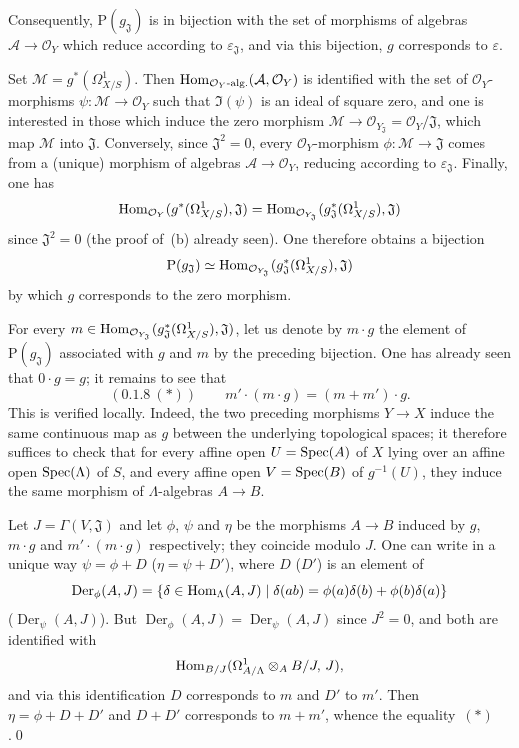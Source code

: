 Consequently, \(\mathrm{P}(g_{\mathfrak{J}})\) is in bijection with the set of
morphisms of algebras \(\mathcal{A}\to\mathcal{O}_{Y}\) which reduce according
to \(\varepsilon_{\mathfrak{J}}\), and via this bijection, \(g\) corresponds
to \(\varepsilon\).

Set \(\mathcal{M}=g^{*}(\Omega^{1}_{X/S})\). Then
\(\operatorname{Hom}_{\mathcal{O}_{Y}\textup{-alg.}}(\mathcal{A},\mathcal{O}_{Y})\) is
identified with the set of \(\mathcal{O}_{Y}\)-morphisms
\(\psi\colon\mathcal{M}\to\mathcal{O}_{Y}\) such that \(\Im(\psi)\) is an ideal
of square zero, and one is interested in those which induce the zero
morphism \(\mathcal{M}\to\mathcal{O}_{Y_{\mathfrak{J}}}
=\mathcal{O}_{Y}/\mathfrak{J}\), \ie which map \(\mathcal{M}\) into
\(\mathfrak{J}\). Conversely, since \(\mathfrak{J}^{2}=0\), every
\(\mathcal{O}_{Y}\)-morphism \(\phi\colon\mathcal{M}\to\mathfrak{J}\) comes
from a (unique) morphism of algebras \(\mathcal{A}\to\mathcal{O}_{Y}\),
reducing according to \(\varepsilon_{\mathfrak{J}}\). Finally, one has
\[
\operatorname{Hom}_{\mathcal{O}_{Y}}(g^{*}(\Omega^{1}_{X/S}),\mathfrak{J})
=\operatorname{Hom}_{\mathcal{O}_{Y_{\mathfrak{J}}}}(g_{\mathfrak{J}}^{*}(\Omega^{1}_{X/S}),\mathfrak{J})
\]
since \(\mathfrak{J}^{2}=0\) (\cf the proof of~(b) already seen). One
therefore obtains a bijection
\[
\mathrm{P}(g_{\mathfrak{J}})
\simeq
\operatorname{Hom}_{\mathcal{O}_{Y_{\mathfrak{J}}}}(g_{\mathfrak{J}}^{*}(\Omega^{1}_{X/S}),\mathfrak{J})
\]
by which \(g\) corresponds to the zero morphism.

For every \(m\in\operatorname{Hom}_{\mathcal{O}_{Y_{\mathfrak{J}}}}(g_{\mathfrak{J}}^{*}(\Omega^{1}_{X/S}),\mathfrak{J})\),
let us denote by \(m\cdot g\) the element of \(\mathrm{P}(g_{\mathfrak{J}})\)
associated with \(g\) and \(m\) by the preceding bijection. One has already
seen that \(0\cdot g=g\); it remains to see that
\[
(0.1.8\ (*))\qquad m'\cdot(m\cdot g)=(m+m')\cdot g.
\]
This is verified locally.%
{\renewcommand{\thefootnote}{(14)}}
Indeed, the two preceding morphisms \(Y\to X\) induce the same continuous
map as \(g\) between the underlying topological spaces; it therefore
suffices to check that for every affine open \(U=\operatorname{Spec}(A)\) of \(X\) lying
over an affine open \(\operatorname{Spec}(\Lambda)\) of \(S\), and every affine open
\(V=\operatorname{Spec}(B)\) of \(g^{-1}(U)\), they induce the same morphism of
\(\Lambda\)-algebras \(A\to B\).

Let \(J=\Gamma(V,\mathfrak{J})\) and let \(\phi\), \(\psi\) and \(\eta\) be the
morphisms \(A\to B\) induced by \(g\), \(m\cdot g\) and \(m'\cdot(m\cdot g)\)
respectively; they coincide modulo \(J\). One can write in a unique way
\(\psi=\phi+D\) (\resp \(\eta=\psi+D'\)), where \(D\) (\resp \(D'\)) is an
element of
\[
\operatorname{Der}_{\phi}(A,J)
=\{\delta\in\operatorname{Hom}_{\Lambda}(A,J)\mid
\delta(ab)=\phi(a)\delta(b)+\phi(b)\delta(a)\}
\]
(\resp \(\operatorname{Der}_{\psi}(A,J)\)). But
\(\operatorname{Der}_{\phi}(A,J)=\operatorname{Der}_{\psi}(A,J)\) since
\(J^{2}=0\), and both are identified with
\[
\operatorname{Hom}_{B/J}(\Omega^{1}_{A/\Lambda}\otimes_{A}B/J,\,J),
\]
and via this identification \(D\) corresponds to \(m\) and \(D'\) to \(m'\).
Then \(\eta=\phi+D+D'\) and \(D+D'\) corresponds to \(m+m'\), whence the
equality~\((*)\).\qed

